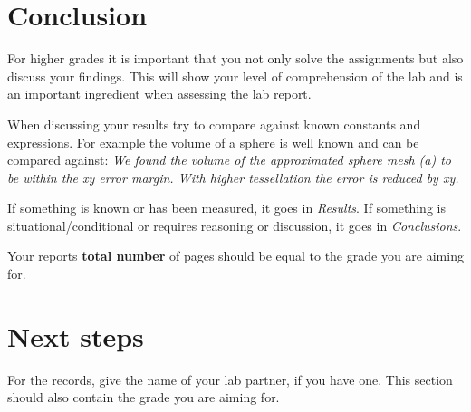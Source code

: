\documentclass[twocolumn]{article}
\begin{document}
\section{Conclusion}
For higher grades it is important that you not only solve the assignments but also discuss your findings. This will show your level of comprehension of the lab and is an important ingredient when assessing the lab report.

When discussing your results try to compare against known constants and expressions. For example the volume of a sphere is well known and can be compared against: \emph{We found the volume of the approximated sphere mesh (a) to be within the xy error margin. With higher tessellation the error is reduced by xy.}

If something is known or has been measured, it goes in \emph{Results}. If something is situational/conditional or requires reasoning or discussion, it goes in \emph{Conclusions}.

Your reports \textbf{total number} of pages should be equal to the grade you are aiming for.

\section{Next steps}
For the records, give the name of your lab partner, if you have one. This section should also contain the grade you are aiming for.

\nocite{*}


\end{document}
